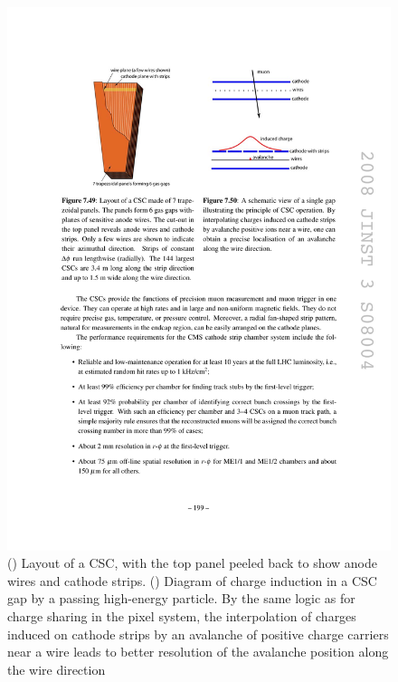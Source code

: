 \begin{figure}[hbtp]
  \begin{center}
    \includegraphics[width=1.75\cmsFigWidth]{figures/cms-muon-CSCcell}
    \caption{(\cmsLeft) Layout of a CSC, with the top panel peeled back to show anode wires and cathode strips. (\cmsRight) Diagram of charge induction in a CSC gap by a passing high-energy particle. By the same logic as for charge sharing in the pixel system, the interpolation of charges induced on cathode strips by an avalanche of positive charge carriers near a wire leads to better resolution of the avalanche position along the wire direction~\cite{1748-0221-3-08-S08004}}
    \label{fig:cms-muon-CSCcell}
  \end{center}
\end{figure}

